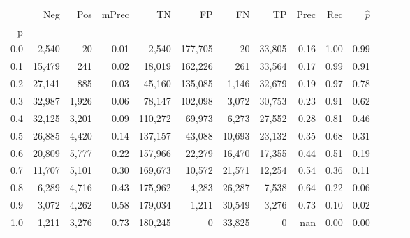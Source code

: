 \begin{tabular}{rrrrrrrrrrrrrr}
\toprule
{} &     Neg &    Pos & mPrec &       TN &       FP &      FN &      TP &  Prec &   Rec & $\hat{p}$ \\
p   &         &        &       &          &          &         &         &       &       &           \\
\midrule
0.0 &   2,540 &     20 &  0.01 &    2,540 &  177,705 &      20 &  33,805 &  0.16 &  1.00 &      0.99 \\
0.1 &  15,479 &    241 &  0.02 &   18,019 &  162,226 &     261 &  33,564 &  0.17 &  0.99 &      0.91 \\
0.2 &  27,141 &    885 &  0.03 &   45,160 &  135,085 &   1,146 &  32,679 &  0.19 &  0.97 &      0.78 \\
0.3 &  32,987 &  1,926 &  0.06 &   78,147 &  102,098 &   3,072 &  30,753 &  0.23 &  0.91 &      0.62 \\
0.4 &  32,125 &  3,201 &  0.09 &  110,272 &   69,973 &   6,273 &  27,552 &  0.28 &  0.81 &      0.46 \\
0.5 &  26,885 &  4,420 &  0.14 &  137,157 &   43,088 &  10,693 &  23,132 &  0.35 &  0.68 &      0.31 \\
0.6 &  20,809 &  5,777 &  0.22 &  157,966 &   22,279 &  16,470 &  17,355 &  0.44 &  0.51 &      0.19 \\
0.7 &  11,707 &  5,101 &  0.30 &  169,673 &   10,572 &  21,571 &  12,254 &  0.54 &  0.36 &      0.11 \\
0.8 &   6,289 &  4,716 &  0.43 &  175,962 &    4,283 &  26,287 &   7,538 &  0.64 &  0.22 &      0.06 \\
0.9 &   3,072 &  4,262 &  0.58 &  179,034 &    1,211 &  30,549 &   3,276 &  0.73 &  0.10 &      0.02 \\
1.0 &   1,211 &  3,276 &  0.73 &  180,245 &        0 &  33,825 &       0 &   nan &  0.00 &      0.00 \\
\bottomrule
\end{tabular}
